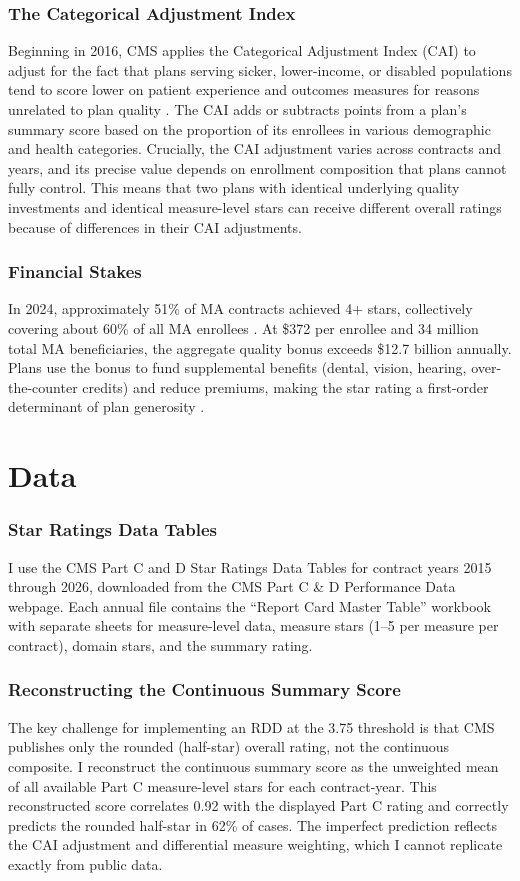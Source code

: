 \documentclass[12pt]{article}
\begin{document}
\subsubsection*{The Categorical Adjustment Index} Beginning in 2016, CMS applies the Categorical Adjustment Index (CAI) to adjust for the fact that plans serving sicker, lower-income, or disabled populations tend to score lower on patient experience and outcomes measures for reasons unrelated to plan quality \citep{cms_cai_2021}. The CAI adds or subtracts points from a plan's summary score based on the proportion of its enrollees in various demographic and health categories. Crucially, the CAI adjustment varies across contracts and years, and its precise value depends on enrollment composition that plans cannot fully control. This means that two plans with identical underlying quality investments and identical measure-level stars can receive different overall ratings because of differences in their CAI adjustments.

\subsubsection*{Financial Stakes} In 2024, approximately 51\% of MA contracts achieved 4+ stars, collectively covering about 60\% of all MA enrollees \citep{kff_ma_2024}. At \$372 per enrollee and 34 million total MA beneficiaries, the aggregate quality bonus exceeds \$12.7 billion annually. Plans use the bonus to fund supplemental benefits (dental, vision, hearing, over-the-counter credits) and reduce premiums, making the star rating a first-order determinant of plan generosity \citep{meyers2014}.


\section{Data}
\label{sec:data}

\subsubsection*{Star Ratings Data Tables} I use the CMS Part C and D Star Ratings Data Tables for contract years 2015 through 2026, downloaded from the CMS Part C \& D Performance Data webpage. Each annual file contains the ``Report Card Master Table'' workbook with separate sheets for measure-level data, measure stars (1--5 per measure per contract), domain stars, and the summary rating.

\subsubsection*{Reconstructing the Continuous Summary Score} The key challenge for implementing an RDD at the 3.75 threshold is that CMS publishes only the rounded (half-star) overall rating, not the continuous composite. I reconstruct the continuous summary score as the unweighted mean of all available Part C measure-level stars for each contract-year. This reconstructed score correlates 0.92 with the displayed Part C rating and correctly predicts the rounded half-star in 62\% of cases. The imperfect prediction reflects the CAI adjustment and differential measure weighting, which I cannot replicate exactly from public data.
\end{document}
